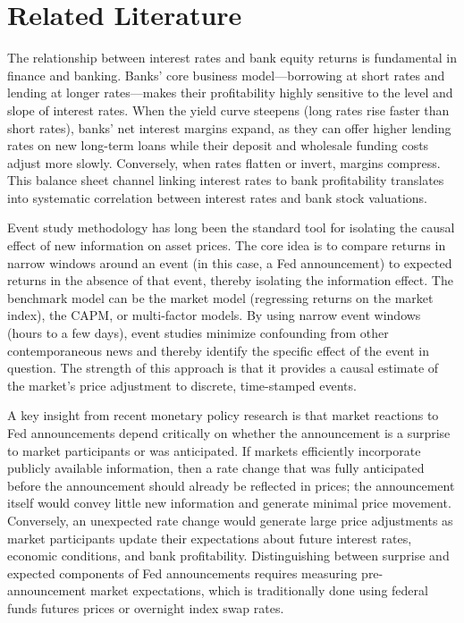 \documentclass{article}
\begin{document}
\section{Related Literature}

The relationship between interest rates and bank equity returns is fundamental in finance and banking. Banks' core business model—borrowing at short rates and lending at longer rates—makes their profitability highly sensitive to the level and slope of interest rates. When the yield curve steepens (long rates rise faster than short rates), banks' net interest margins expand, as they can offer higher lending rates on new long-term loans while their deposit and wholesale funding costs adjust more slowly. Conversely, when rates flatten or invert, margins compress. This balance sheet channel linking interest rates to bank profitability translates into systematic correlation between interest rates and bank stock valuations.

Event study methodology has long been the standard tool for isolating the causal effect of new information on asset prices. The core idea is to compare returns in narrow windows around an event (in this case, a Fed announcement) to expected returns in the absence of that event, thereby isolating the information effect. The benchmark model can be the market model (regressing returns on the market index), the CAPM, or multi-factor models. By using narrow event windows (hours to a few days), event studies minimize confounding from other contemporaneous news and thereby identify the specific effect of the event in question. The strength of this approach is that it provides a causal estimate of the market's price adjustment to discrete, time-stamped events.

A key insight from recent monetary policy research is that market reactions to Fed announcements depend critically on whether the announcement is a surprise to market participants or was anticipated. If markets efficiently incorporate publicly available information, then a rate change that was fully anticipated before the announcement should already be reflected in prices; the announcement itself would convey little new information and generate minimal price movement. Conversely, an unexpected rate change would generate large price adjustments as market participants update their expectations about future interest rates, economic conditions, and bank profitability. Distinguishing between surprise and expected components of Fed announcements requires measuring pre-announcement market expectations, which is traditionally done using federal funds futures prices or overnight index swap rates.
\end{document}
